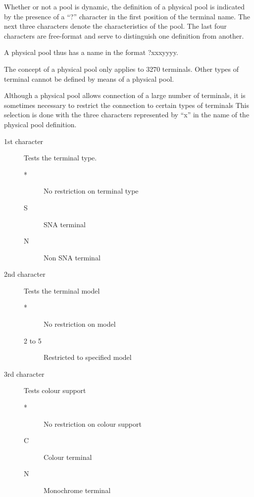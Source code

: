 \documentclass[letterpaper,10pt,english]{sphinxmanual}
\begin{document}
Whether or not a pool is dynamic, the definition of a physical pool is indicated by the presence of a “?” character in the first position of the terminal name. The next three characters denote the characteristics of the pool. The last four characters are free-format and serve to distinguish one definition from another.

A physical pool thus has a name in the format ?xxxyyyy.

The concept of a physical pool only applies to 3270 terminals. Other types of terminal cannot be defined by means of a physical pool.

Although a physical pool allows connection of a large number of terminals, it is sometimes necessary to restrict the connection to certain types of terminals This selection is done with the three characters represented by “x” in the name of the physical pool definition.
\begin{description}
\item[{1st character}] \leavevmode
Tests the terminal type.
\begin{description}
\item[{*}] \leavevmode
No restriction on terminal type

\item[{S}] \leavevmode
SNA terminal

\item[{N}] \leavevmode
Non SNA terminal

\end{description}

\item[{2nd character}] \leavevmode
Tests the terminal model
\begin{description}
\item[{*}] \leavevmode
No restriction on model

\item[{2 to 5}] \leavevmode
Restricted to specified model

\end{description}

\item[{3rd character}] \leavevmode
Tests colour support
\begin{description}
\item[{*}] \leavevmode
No restriction on colour support

\item[{C}] \leavevmode
Colour terminal

\item[{N}] \leavevmode
Monochrome terminal

\end{description}

\end{description}
\end{document}
